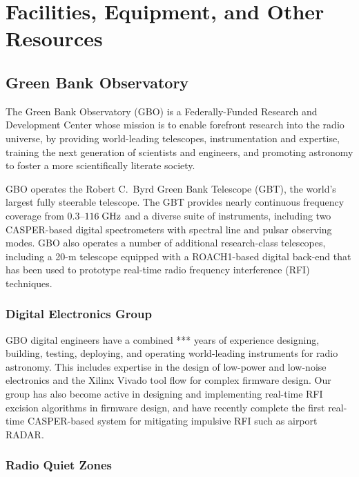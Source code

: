 \documentclass[10pt]{NSF}
\begin{document}
\section{Facilities, Equipment, and Other Resources}

\subsection{Green Bank Observatory}
\label{sec:gbo}

The Green Bank Observatory (GBO) is a Federally-Funded Research and
Development Center whose mission is to enable forefront research into
the radio universe, by providing world-leading telescopes,
instrumentation and expertise, training the next generation of
scientists and engineers, and promoting astronomy to foster a more
scientifically literate society.

GBO operates the Robert C.\ Byrd Green Bank Telescope (GBT), the
world's largest fully steerable telescope.  The GBT provides nearly
continuous frequency coverage from $0.3$--$116\; \textrm{GHz}$ and a diverse
suite of instruments, including two CASPER-based digital spectrometers
with spectral line and pulsar observing modes.  GBO also operates a
number of additional research-class telescopes, including a 20-m
telescope equipped with a ROACH1-based digital back-end that has been
used to prototype real-time radio frequency interference (RFI)
techniques.

\subsubsection{Digital Electronics Group}
\label{sec:digital_group}

GBO digital engineers have a combined *** years of experience
designing, building, testing, deploying, and operating world-leading
instruments for radio astronomy.  This includes expertise in the
design of low-power and low-noise electronics and the Xilinx Vivado
tool flow for complex firmware design.  Our group has also become
active in designing and implementing real-time RFI excision algorithms
in firmware design, and have recently complete the first real-time
CASPER-based system for mitigating impulsive RFI such as airport
RADAR.

\subsubsection{Radio Quiet Zones}
\label{sec:quiet_zone}
\end{document}
